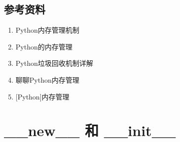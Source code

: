 \documentclass[letterpaper,10pt,english]{sphinxmanual}
\begin{document}
\subsection{参考资料}
\label{\detokenize{python/15_memManage:id12}}\begin{enumerate}
\item {} 
Python内存管理机制

\end{enumerate}
\begin{quote}

\end{quote}
\begin{enumerate}
\setcounter{enumi}{1}
\item {} 
Python的内存管理

\end{enumerate}
\begin{quote}

\end{quote}
\begin{enumerate}
\setcounter{enumi}{2}
\item {} 
Python垃圾回收机制详解

\end{enumerate}
\begin{quote}

\end{quote}
\begin{enumerate}
\setcounter{enumi}{3}
\item {} 
聊聊Python内存管理

\end{enumerate}
\begin{quote}

\end{quote}
\begin{enumerate}
\setcounter{enumi}{4}
\item {} 
{[}Python{]}内存管理

\end{enumerate}
\begin{quote}

\end{quote}


\section{\_\_new\_\_ 和 \_\_init\_\_}
\label{\detokenize{python/16_newInit::doc}}\label{\detokenize{python/16_newInit:new-init}}
\end{document}
